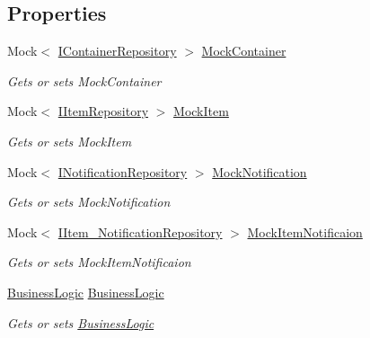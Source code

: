 \subsection*{Properties}
\begin{DoxyCompactItemize}
\item 
Mock$<$ \mbox{\hyperlink{interface_gtd_app_1_1_repository_1_1_interfaces_1_1_i_container_repository}{I\+Container\+Repository}} $>$ \mbox{\hyperlink{class_gtd_app_1_1_logic_1_1_tests_1_1_business_logic_tests_a639d20201a1cdacf6107d2bb45275d1f}{Mock\+Container}}
\begin{DoxyCompactList}\small\item\em Gets or sets Mock\+Container \end{DoxyCompactList}\item 
Mock$<$ \mbox{\hyperlink{interface_gtd_app_1_1_repository_1_1_interfaces_1_1_i_item_repository}{I\+Item\+Repository}} $>$ \mbox{\hyperlink{class_gtd_app_1_1_logic_1_1_tests_1_1_business_logic_tests_a6879df6cb70e643c11fb4e0f9344c68d}{Mock\+Item}}
\begin{DoxyCompactList}\small\item\em Gets or sets Mock\+Item \end{DoxyCompactList}\item 
Mock$<$ \mbox{\hyperlink{interface_gtd_app_1_1_repository_1_1_interfaces_1_1_i_notification_repository}{I\+Notification\+Repository}} $>$ \mbox{\hyperlink{class_gtd_app_1_1_logic_1_1_tests_1_1_business_logic_tests_a2bb9b185d9d68fda239c1ce46ffee766}{Mock\+Notification}}
\begin{DoxyCompactList}\small\item\em Gets or sets Mock\+Notification \end{DoxyCompactList}\item 
Mock$<$ \mbox{\hyperlink{interface_gtd_app_1_1_repository_1_1_interfaces_1_1_i_item___notification_repository}{I\+Item\+\_\+\+Notification\+Repository}} $>$ \mbox{\hyperlink{class_gtd_app_1_1_logic_1_1_tests_1_1_business_logic_tests_a1db4e654f6535bcb9bd3d460de5d8398}{Mock\+Item\+Notificaion}}
\begin{DoxyCompactList}\small\item\em Gets or sets Mock\+Item\+Notificaion \end{DoxyCompactList}\item 
\mbox{\hyperlink{class_gtd_app_1_1_logic_1_1_business_logic}{Business\+Logic}} \mbox{\hyperlink{class_gtd_app_1_1_logic_1_1_tests_1_1_business_logic_tests_a22d41d9d367c4ba5ac5e8bf7cbb9cbd2}{Business\+Logic}}
\begin{DoxyCompactList}\small\item\em Gets or sets \mbox{\hyperlink{class_gtd_app_1_1_logic_1_1_business_logic}{Business\+Logic}} \end{DoxyCompactList}\end{DoxyCompactItemize}
